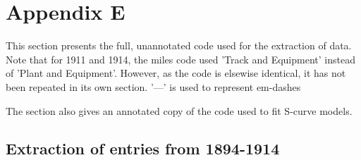 \newpage
\section{Appendix E}
This section presents the full, unannotated code used for the extraction of data. Note that for 1911 and 1914, the miles code used 'Track and Equipment' instead of 'Plant and Equipment'. However, as the code is elsewise identical, it has not been repeated in its own section. '---' is used to represent em-dashes

The section also gives an annotated copy of the code used to fit S-curve models.

\subsection{Extraction of entries from 1894-1914}
